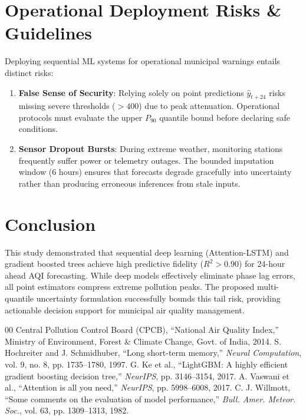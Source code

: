 \documentclass[10pt,journal,compsoc,twocolumn]{article}
\begin{document}
\section{Operational Deployment Risks \& Guidelines}
Deploying sequential ML systems for operational municipal warnings entails distinct risks:
\begin{enumerate}
    \item \textbf{False Sense of Security}: Relying solely on point predictions $\hat{y}_{t+24}$ risks missing severe thresholds ($>400$) due to peak attenuation. Operational protocols must evaluate the upper $P_{90}$ quantile bound before declaring safe conditions.
    \item \textbf{Sensor Dropout Bursts}: During extreme weather, monitoring stations frequently suffer power or telemetry outages. The bounded imputation window ($6$ hours) ensures that forecasts degrade gracefully into uncertainty rather than producing erroneous inferences from stale inputs.
\end{enumerate}

\section{Conclusion}
This study demonstrated that sequential deep learning (Attention-LSTM) and gradient boosted trees achieve high predictive fidelity ($R^2 > 0.90$) for 24-hour ahead AQI forecasting. While deep models effectively eliminate phase lag errors, all point estimators compress extreme pollution peaks. The proposed multi-quantile uncertainty formulation successfully bounds this tail risk, providing actionable decision support for municipal air quality management.

\begin{thebibliography}{00}
 Central Pollution Control Board (CPCB), ``National Air Quality Index,'' Ministry of Environment, Forest \& Climate Change, Govt. of India, 2014.
 S. Hochreiter and J. Schmidhuber, ``Long short-term memory,'' \textit{Neural Computation}, vol. 9, no. 8, pp. 1735--1780, 1997.
 G. Ke et al., ``LightGBM: A highly efficient gradient boosting decision tree,'' \textit{NeurIPS}, pp. 3146--3154, 2017.
 A. Vaswani et al., ``Attention is all you need,'' \textit{NeurIPS}, pp. 5998--6008, 2017.
 C. J. Willmott, ``Some comments on the evaluation of model performance,'' \textit{Bull. Amer. Meteor. Soc.}, vol. 63, pp. 1309--1313, 1982.
\end{thebibliography}
\end{document}
